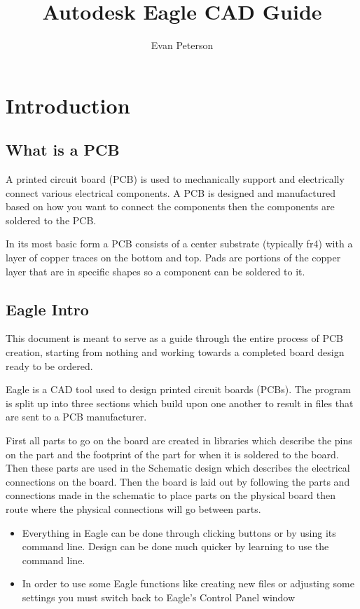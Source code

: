 \documentclass{article}
\title{Autodesk Eagle CAD Guide}
\author{Evan Peterson}
\begin{document}
\maketitle{}
\setcounter{tocdepth}{2}
\tableofcontents
\pagebreak

\section{Introduction}

\subsection{What is a PCB}
A printed circuit board (PCB) is used to mechanically support and electrically connect various electrical components. A PCB is designed and manufactured based on how you want to connect the components then the components are soldered to the PCB. \par
In its most basic form a PCB consists of a center substrate (typically fr4) with a layer of copper traces on the bottom and top. Pads are portions of the copper layer that are in specific shapes so a component can be soldered to it.

\subsection{Eagle Intro}

This document is meant to serve as a guide through the entire process of PCB creation, starting from nothing and working towards a completed board design ready to be ordered. \par
Eagle is a CAD tool used to design printed circuit boards (PCBs). The program is split up into three sections which build upon one another to result in files that are sent to a PCB manufacturer.\par
First all parts to go on the board are created in libraries which describe the pins on the part and the footprint of the part for when it is soldered to the board. Then these parts are used in the Schematic design which describes the electrical connections on the board. Then the board is laid out by following the parts and connections made in the schematic to place parts on the physical board then route where the physical connections will go between parts.
\begin{tcolorbox} [title=Tips \& Tricks]
    \begin{itemize}
        \item Everything in Eagle can be done through clicking buttons or by using its command line. Design can be done much quicker by learning to use the command line.
        \item In order to use some Eagle functions like creating new files or adjusting some settings you must switch back to Eagle's Control Panel window
    \end{itemize}
\end{tcolorbox}
\end{document}
